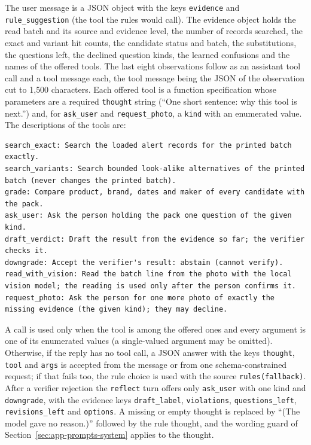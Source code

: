 The user message is a JSON object with the keys \texttt{evidence} and \texttt{rule\_suggestion} (the tool the rules would call). The evidence object holds the read batch and its source and evidence level, the number of records searched, the exact and variant hit counts, the candidate status and batch, the substitutions, the questions left, the declined question kinds, the learned confusions and the names of the offered tools. The last eight observations follow as an assistant tool call and a tool message each, the tool message being the JSON of the observation cut to 1{,}500 characters. Each offered tool is a function specification whose parameters are a required \texttt{thought} string (``One short sentence: why this tool is next.'') and, for \texttt{ask\_user} and \texttt{request\_photo}, a \texttt{kind} with an enumerated value. The descriptions of the tools are:
\begin{lstlisting}[language={},numbers=none,caption={Tool descriptions offered to the model (\texttt{TOOL\_SPECS})},label={lst:app-toolspecs}]
search_exact: Search the loaded alert records for the printed batch exactly.
search_variants: Search bounded look-alike alternatives of the printed batch (never changes the printed batch).
grade: Compare product, brand, dates and maker of every candidate with the pack.
ask_user: Ask the person holding the pack one question of the given kind.
draft_verdict: Draft the result from the evidence so far; the verifier checks it.
downgrade: Accept the verifier's result: abstain (cannot verify).
read_with_vision: Read the batch line from the photo with the local vision model; the reading is used only after the person confirms it.
request_photo: Ask the person for one more photo of exactly the missing evidence (the given kind); they may decline.
\end{lstlisting}
A call is used only when the tool is among the offered ones and every argument is one of its enumerated values (a single-valued argument may be omitted). Otherwise, if the reply has no tool call, a JSON answer with the keys \texttt{thought}, \texttt{tool} and \texttt{args} is accepted from the message or from one schema-constrained request; if that fails too, the rule choice is used with the source \texttt{rules(fallback)}. After a verifier rejection the \texttt{reflect} turn offers only \texttt{ask\_user} with one kind and \texttt{downgrade}, with the evidence keys \texttt{draft\_label}, \texttt{violations}, \texttt{questions\_left}, \texttt{revisions\_left} and \texttt{options}. A missing or empty thought is replaced by ``(The model gave no reason.)'' followed by the rule thought, and the wording guard of Section~\ref{sec:app-prompts-system} applies to the thought.


